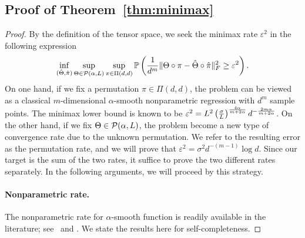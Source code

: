 \documentclass[11pt]{article}
\theoremstyle{definition}
\begin{document}
\subsection{Proof of Theorem~\ref{thm:minimax}}
\begin{proof} By the definition of the tensor space, we seek the minimax rate $\varepsilon^2$ in the following expression
\begin{equation}\label{eq:final}
\inf_{(\hat \Theta,\hat \pi)}\sup_{\Theta\in \mathcal{P}(\alpha,L)}\sup_{\pi\in\Pi(d,d)} \mathbb{P}\left({1\over d^m}\lVert\Theta\circ \pi-\hat \Theta\circ \hat \pi\rVert_F^2 \geq \varepsilon^2 \right).
\end{equation}
On one hand, if we fix a permutation $\pi\in\Pi(d,d)$, the problem can be viewed as a classical $m$-dimensional $\alpha$-smooth nonparametric regression with $d^m$ sample points. The minimax lower bound is known to be $\varepsilon^2=L^2\left(\sigma\over L\right)^{4\alpha\over m+2\alpha}d^{-{2m\alpha\over m+2\alpha}}$. On the other hand, if we fix $\Theta\in\mathcal{P}(\alpha,L)$, the problem become a new type of convergence rate due to the unknown permutation. We refer to the resulting error as the permutation rate, and we will prove that $\varepsilon^2=\sigma^2 d^{-(m-1)}\log d$. Since our target is the sum of the two rates, it suffice to prove the two different rates separately. In the following arguments, we will proceed by this strategy. 

\paragraph{Nonparametric rate.} The nonparametric rate for $\alpha$-smooth function is readily available in the literature; see \citet[Section 3.2]{gyorfi2002distribution}~and \citet[Section 2]{stone1982optimal}. We state the results here for self-completeness. 


\end{proof}
\end{document}
